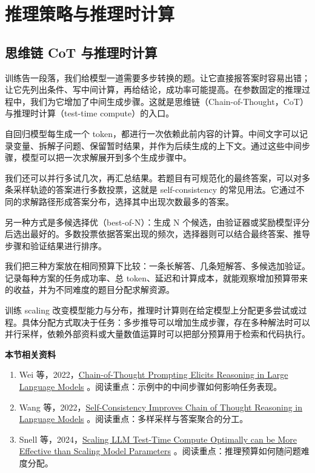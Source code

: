 \chapter{推理策略与推理时计算}\label{推理策略与推理时计算}

\section{思维链 CoT 与推理时计算}\label{思维链 CoT 与推理时计算}

训练告一段落，我们给模型一道需要多步转换的题。让它直接报答案时容易出错；让它先列出条件、写中间计算，再给结论，成功率可能提高。在参数固定的推理过程中，我们为它增加了中间生成步骤。这就是思维链（Chain-of-Thought，CoT）与推理时计算（test-time compute）的入口。

自回归模型每生成一个 token，都进行一次依赖此前内容的计算。中间文字可以记录变量、拆解子问题、保留暂时结果，并作为后续生成的上下文。通过这些中间步骤，模型可以把一次求解展开到多个生成步骤中。

我们还可以并行多试几次，再汇总结果。若题目有可规范化的最终答案，可以对多条采样轨迹的答案进行多数投票，这就是 self-consistency 的常见用法。它通过不同的求解路径形成答案分布，选择其中出现次数最多的答案。

另一种方式是多候选择优（best-of-N）：生成 N 个候选，由验证器或奖励模型评分后选出最好的。多数投票依据答案出现的频次，选择器则可以结合最终答案、推导步骤和验证结果进行排序。

我们把三种方案放在相同预算下比较：一条长解答、几条短解答、多候选加验证。记录每种方案的任务成功率、总 token、延迟和计算成本，就能观察增加预算带来的收益，并为不同难度的题目分配求解资源。

训练 scaling 改变模型能力与分布，推理时计算则在给定模型上分配更多尝试或过程。具体分配方式取决于任务：多步推导可以增加生成步骤，存在多种解法时可以并行采样，依赖外部资料或大量数值运算时可以把部分预算用于检索和代码执行。

\textbf{本节相关资料}
\begin{enumerate}
    \item Wei 等，2022，\href{https://arxiv.org/abs/2201.11903}{Chain-of-Thought Prompting Elicits Reasoning in Large Language Models} 。阅读重点：示例中的中间步骤如何影响任务表现。
    \item Wang 等，2022，\href{https://arxiv.org/abs/2203.11171}{Self-Consistency Improves Chain of Thought Reasoning in Language Models} 。阅读重点：多样采样与答案聚合的分工。
    \item Snell 等，2024，\href{https://arxiv.org/abs/2408.03314}{Scaling LLM Test-Time Compute Optimally can be More Effective than Scaling Model Parameters} 。阅读重点：推理预算如何随问题难度分配。
\end{enumerate}

